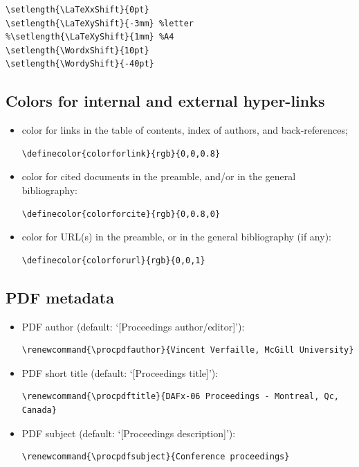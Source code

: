 \documentclass{article}
\begin{document}
\begin{verbatim}
\setlength{\LaTeXxShift}{0pt}
\setlength{\LaTeXyShift}{-3mm} %letter
%\setlength{\LaTeXyShift}{1mm} %A4
\setlength{\WordxShift}{10pt}
\setlength{\WordyShift}{-40pt}
\end{verbatim}

\subsection{Colors for internal and external hyper-links}\label{sec:custom:colors}

\begin{itemize}
  \item color for links in the table of contents, index of authors, and back-references;
\begin{verbatim}
\definecolor{colorforlink}{rgb}{0,0,0.8}
\end{verbatim}
  \item color for cited documents in the preamble, and/or in the general bibliography:
\begin{verbatim}
\definecolor{colorforcite}{rgb}{0,0.8,0} 
\end{verbatim}
  \item color for URL(s) in the preamble, or in the general bibliography (if any):
\begin{verbatim}
\definecolor{colorforurl}{rgb}{0,0,1}
\end{verbatim}
\end{itemize}

\subsection{PDF metadata}\label{sec:custom:metadata}

\begin{itemize}
  \item PDF author (default: `[Proceedings author/editor]'):
\begin{verbatim}
\renewcommand{\procpdfauthor}{Vincent Verfaille, McGill University}
\end{verbatim}
  \item PDF short title (default: `[Proceedings title]'):
\begin{verbatim}
\renewcommand{\procpdftitle}{DAFx-06 Proceedings - Montreal, Qc, Canada}
\end{verbatim}
  \item PDF subject (default: `[Proceedings description]'):
\begin{verbatim}
\renewcommand{\procpdfsubject}{Conference proceedings}
\end{verbatim}
\end{itemize}
\end{document}
